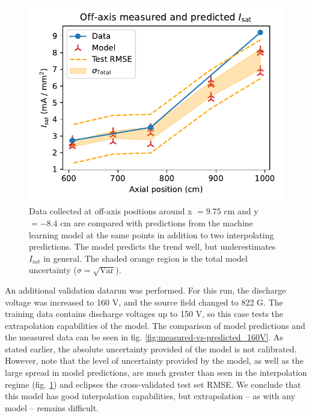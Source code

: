 \begin{figure}
	\centering
	\includegraphics[width=\textwidth]{figures/strongest_axial_var-validation.pdf}
	\caption[size=12]{\label{fig:strongest_axial_var-validation}Data collected at off-axis positions around x $=9.75$ cm and y $=-8.4$ cm are compared with predictions from the machine learning model at the same points in addition to two interpolating predictions. The model predicts the trend well, but underestimates $I_\text{sat}$ in general. The shaded orange region is the total model uncertainty ($\sigma = \sqrt{\text{Var}}$).}
\end{figure}

An additional validation datarun was performed. For this run, the discharge voltage was increased to 160 V, and the source field changed to 822 G. The training data contains discharge voltages up to 150 V, so this case tests the extrapolation capabilities of the model. The comparison of model predictions and the measured data can be seen in fig. \ref{fig:measured-vs-predicted_160V}. As stated earlier, the absolute uncertainty provided of the model is not calibrated. However, note that the level of uncertainty provided by the model, as well as the large spread in model predictions, are much greater than seen in the interpolation regime (fig. \ref{fig:strongest_axial_var-validation}) and eclipses the cross-validated test set RMSE. We conclude that this model has good interpolation capabilities, but extrapolation -- as with any model -- remains difficult.


